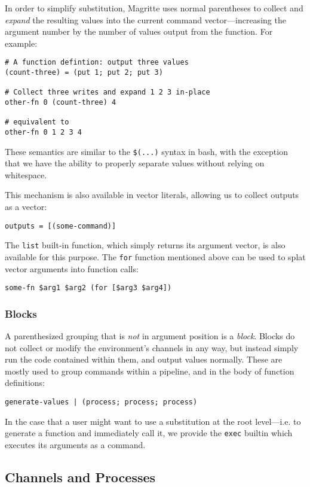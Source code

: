 \ifsigpro{ \documentclass[english,PRO]{ipsj} }
\begin{document}
In order to simplify substitution, Magritte uses normal parentheses to collect and \emph{expand} the resulting values into the current command vector---increasing the argument number by the number of values output from the function. For example:
\begin{lstlisting}
# A function defintion: output three values
(count-three) = (put 1; put 2; put 3)

# Collect three writes and expand 1 2 3 in-place
other-fn 0 (count-three) 4

# equivalent to
other-fn 0 1 2 3 4
\end{lstlisting}

\noindent
These semantics are similar to the \verb/$(...)/ syntax in bash, with the exception that we have the ability to properly separate values without relying on whitespace.

This mechanism is also available in vector literals, allowing us to collect outputs as a vector:
\begin{lstlisting}
outputs = [(some-command)]
\end{lstlisting}
\noindent
The \verb/list/ built-in function, which simply returns its argument vector, is also available for this purpose.
The \verb/for/ function mentioned above can be used to splat vector arguments into function calls:
\begin{lstlisting}
some-fn $arg1 $arg2 (for [$arg3 $arg4])
\end{lstlisting}

\subsubsection{Blocks}\noindent
A parenthesized grouping that is \emph{not} in argument position is a \emph{block}. Blocks do not collect or modify the environment's channels in any way, but instead simply run the code contained within them, and output values normally. These are mostly used to group commands within a pipeline, and in the body of function definitions:
\begin{lstlisting}
generate-values | (process; process; process)
\end{lstlisting}
\noindent
In the case that a user might want to use a substitution at the root level---i.e. to generate a function and immediately call it, we provide the \verb/exec/ builtin which executes its arguments as a command.

\subsection{Channels and Processes}
\end{document}
